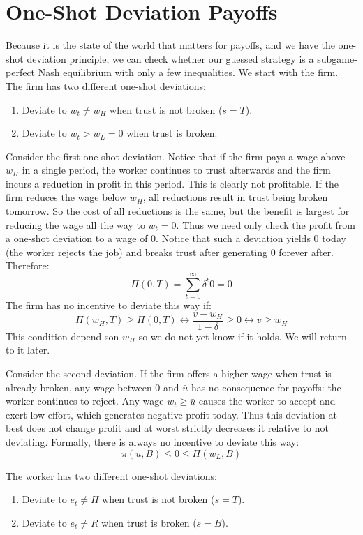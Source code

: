 \documentclass[14pt]{article}
\begin{document}
\section{One-Shot Deviation Payoffs}

Because it is the state of the world that matters for payoffs, and we have the one-shot deviation principle, we can check whether our guessed strategy is a subgame-perfect Nash equilibrium with only a few inequalities. We start with the firm. The firm has two different one-shot deviations:
\begin{enumerate}
    \item Deviate to $w_t\neq w_H$ when trust is not broken ($s=T$).
    \item Deviate to $w_t > w_L=0$ when trust is broken.
\end{enumerate}

Consider the first one-shot deviation. Notice that if the firm pays a wage above $w_H$ in a single period, the worker continues to trust afterwards and the firm incurs a reduction in profit in this period. This is clearly not profitable. If the firm reduces the wage below $w_H$, all reductions result in trust being broken tomorrow. So the cost of all reductions is the same, but the benefit is largest for reducing the wage all the way to $w_t=0$. Thus we need only check the profit from a one-shot deviation to a wage of 0. Notice that such a deviation yields $0$ today (the worker rejects the job) and breaks trust after generating 0 forever after. Therefore:
\[\Pi(0,T)= \sum_{t=0}^\infty \delta^t 0 = 0\]
The firm has no incentive to deviate this way if:
\[ \Pi(w_H, T) \geq \Pi(0,T)  \leftrightarrow  \frac{v-w_H}{1-\delta}  \geq 0 \leftrightarrow v \geq w_H \]
This condition depend son $w_H$ so we do not yet know if it holds. We will return to it later.

Consider the second deviation. If the firm offers a higher wage when trust is already broken, any wage between 0 and $\bar u$ has no consequence for payoffs: the worker continues to reject. Any wage $w_t\geq \bar u$ causes the worker to accept and exert low effort, which generates negative profit today. Thus this deviation at best does not change profit and at worst strictly decreases it relative to not deviating. Formally, there is always no incentive to deviate this way:
\[ \pi(\bar u, B) \leq 0 \leq \Pi(w_L,B) \]

The worker has two different one-shot deviations:

\begin{enumerate}
    \item Deviate to $e_t \neq H$ when trust is not broken ($s=T$).
    \item Deviate to $e_t \neq R$ when trust is broken ($s=B$).
\end{enumerate}
\end{document}
